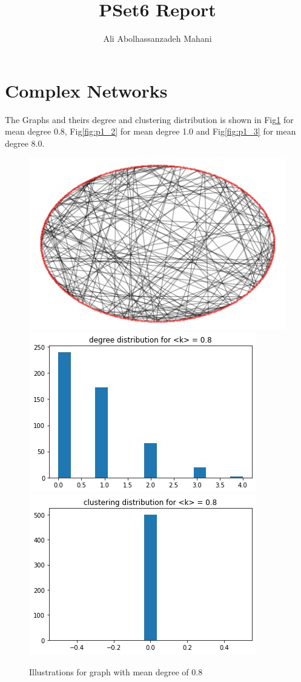 \documentclass[12pt]{article}
\title{PSet6 Report}
\author{Ali Abolhassanzadeh Mahani}
\begin{document}
	\maketitle
	\section{Complex Networks}
	The Graphs and theirs degree and clustering distribution is shown in Fig\ref{fig:p1_1} for mean degree 0.8,
	Fig\ref{fig:p1_2} for mean degree 1.0 and Fig\ref{fig:p1_3} for mean degree 8.0.
	\begin{figure}[h!]
		\centering
		\includegraphics[width=0.4\linewidth]{../p1_0graph.jpg}
		\includegraphics[width=0.4\linewidth]{../p1_0deg.jpg}
		\includegraphics[width=0.4\linewidth]{../p1_0clust.jpg}
		\label{fig:p1_1}
		\caption{Illustrations for graph with mean degree of 0.8}
	\end{figure}
\end{document}

